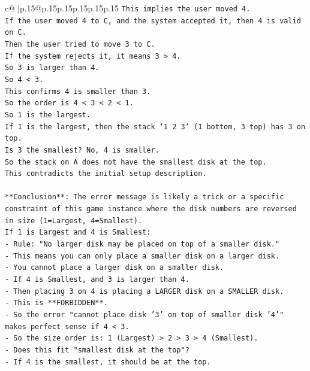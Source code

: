 \documentclass{article}
\begin{document}
{\begin{supertabular}{c@{$\;$}|p{.15\linewidth}@{}p{.15\linewidth}p{.15\linewidth}p{.15\linewidth}p{.15\linewidth}p{.15\linewidth}}
{{{\texttt{This implies the user moved 4.} \\
\texttt{If the user moved 4 to C, and the system accepted it, then 4 is valid on C.} \\
\texttt{Then the user tried to move 3 to C.} \\
\texttt{If the system rejects it, it means 3 > 4.} \\
\texttt{So 3 is larger than 4.} \\
\texttt{So 4 < 3.} \\
\texttt{This confirms 4 is smaller than 3.} \\
\texttt{So the order is 4 < 3 < 2 < 1.} \\
\texttt{So 1 is the largest.} \\
\texttt{If 1 is the largest, then the stack `1 2 3` (1 bottom, 3 top) has 3 on top.} \\
\texttt{Is 3 the smallest? No, 4 is smaller.} \\
\texttt{So the stack on A does not have the smallest disk at the top.} \\
\texttt{This contradicts the initial setup description.} \\
\\ 
\texttt{**Conclusion**: The error message is likely a trick or a specific constraint of this game instance where the disk numbers are reversed in size (1=Largest, 4=Smallest).} \\
\texttt{If 1 is Largest and 4 is Smallest:} \\
\texttt{{-} Rule: "No larger disk may be placed on top of a smaller disk."} \\
\texttt{{-} This means you can only place a smaller disk on a larger disk.} \\
\texttt{{-} You cannot place a larger disk on a smaller disk.} \\
\texttt{{-} If 4 is Smallest, and 3 is larger than 4.} \\
\texttt{{-} Then placing 3 on 4 is placing a LARGER disk on a SMALLER disk.} \\
\texttt{{-} This is **FORBIDDEN**.} \\
\texttt{{-} So the error "cannot place disk '3' on top of smaller disk '4'" makes perfect sense if 4 < 3.} \\
\texttt{{-} So the size order is: 1 (Largest) > 2 > 3 > 4 (Smallest).} \\
\texttt{{-} Does this fit "smallest disk at the top"?} \\
\texttt{{-} If 4 is the smallest, it should be at the top.} \\
}}}
\end{supertabular}}
\end{document}
